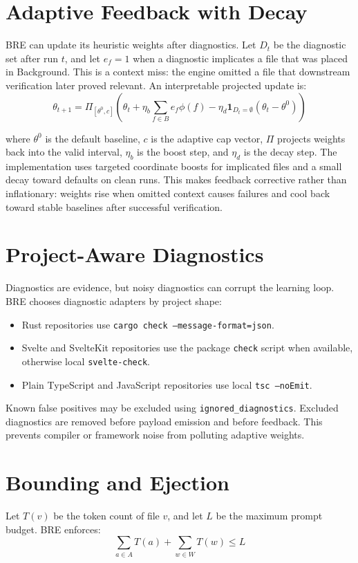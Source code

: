 \documentclass[10pt,twocolumn,letterpaper]{article}
\begin{document}
\section{Adaptive Feedback with Decay}
BRE can update its heuristic weights after diagnostics. Let $D_t$ be the diagnostic set after run $t$, and let $e_f=1$ when a diagnostic implicates a file that was placed in Background. This is a context miss: the engine omitted a file that downstream verification later proved relevant. An interpretable projected update is:
\begin{equation}
\theta_{t+1} =
\Pi_{[\theta^0, c]}
\left(
\theta_t
+ \eta_b \sum_{f \in B} e_f \phi(f)
- \eta_d \mathbf{1}_{D_t=\emptyset}(\theta_t-\theta^0)
\right)
\end{equation}

\noindent where $\theta^0$ is the default baseline, $c$ is the adaptive cap vector, $\Pi$ projects weights back into the valid interval, $\eta_b$ is the boost step, and $\eta_d$ is the decay step. The implementation uses targeted coordinate boosts for implicated files and a small decay toward defaults on clean runs. This makes feedback corrective rather than inflationary: weights rise when omitted context causes failures and cool back toward stable baselines after successful verification.

\section{Project-Aware Diagnostics}
Diagnostics are evidence, but noisy diagnostics can corrupt the learning loop. BRE chooses diagnostic adapters by project shape:
\begin{itemize}
    \item Rust repositories use \texttt{cargo check --message-format=json}.
    \item Svelte and SvelteKit repositories use the package \texttt{check} script when available, otherwise local \texttt{svelte-check}.
    \item Plain TypeScript and JavaScript repositories use local \texttt{tsc --noEmit}.
\end{itemize}

Known false positives may be excluded using \texttt{ignored\_diagnostics}. Excluded diagnostics are removed before payload emission and before feedback. This prevents compiler or framework noise from polluting adaptive weights.

\section{Bounding and Ejection}
Let $T(v)$ be the token count of file $v$, and let $L$ be the maximum prompt budget. BRE enforces:
\begin{equation}
\sum_{a \in A} T(a) + \sum_{w \in W} T(w) \le L
\end{equation}
\end{document}
